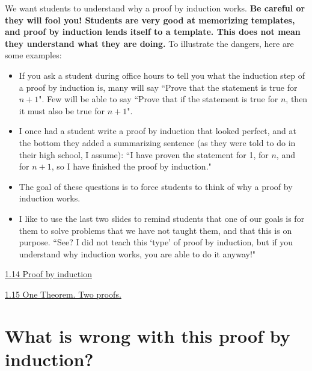 \documentclass[11pt]{article}
\newcommand{\n}{\newpage}
\newcommand{\nl}{\hfill \vspace{-1.1\baselineskip}} %
\newcommand{\vfourteen}{\hspace{8mm}\href{https://www.youtube.com/watch?v=NmgABEiwgLg&list=PLlwePzQY_wW-CPzhk-af-MXj9knthD1gx&index=14}{1.14 Proof by induction}}
\newcommand{\vfifteen}{\hspace{8mm}\href{https://www.youtube.com/watch?v=WPP2TDPXyc8&list=PLlwePzQY_wW-CPzhk-af-MXj9knthD1gx&index=15}{1.15 One Theorem. Two proofs.}}
\begin{document}
\vspace{-1cm}
\begin{warning}
We want students to understand why a proof by induction works.  \textbf{Be careful or they will fool you!  Students are very good at memorizing templates, and proof by induction lends itself to a template.    This does not mean they understand what they are doing. }   To illustrate the dangers, here are some examples:
		\begin{itemize}
			\item  If you ask a student during office hours to tell you what the induction step of a proof by induction is, many will say ``Prove that the statement is true for $n+1$".  Few will be able to say ``Prove that if the statement is true for $n$, then it must also be true for $n+1$".
			\item  I once had a student write a proof by induction that looked perfect, and at the bottom they added a summarizing sentence (as they were told to do in their high school, I assume):  ``I have proven the statement for 1, for $n$, and for $n+1$, so I have finished the proof by induction."
		\end{itemize}
\end{warning}

\begin{comments}
\nl
\begin{itemize}
	\item  The goal of these questions is to force students to think of why a proof by induction works.
	
	\item I like to use the last two slides to remind students that one of our goals is for them to solve problems that we have not taught them, and that this is on purpose.   ``See?  I did not teach this `type' of proof by induction, but if you understand why induction works, you are able to do it anyway!"
\end{itemize}
\end{comments}

\begin{videos}
\vfourteen

\vfifteen
\end{videos}

\n
\newpage
\section{What is wrong with this proof by induction?} 
\end{document}
